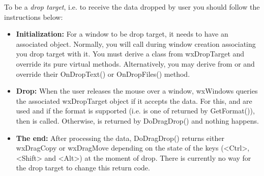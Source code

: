 To be a {\it drop target}, i.e. to receive the data dropped by user you should
follow the instructions below:

\begin{itemize}\itemsep=0pt
\item {\bf Initialization:} For a window to be drop target, it needs to have
an associated  object. Normally, you will
call  during window
creation associating you drop target with it. You must derive a class from
wxDropTarget and override its pure virtual methods. Alternatively, you may
derive from  or
 and override their OnDropText()
or OnDropFiles() method.

\item {\bf Drop:} When the user releases the mouse over a window, wxWindows
queries the associated wxDropTarget object if it accepts the data. For
this,  and  are
used and if the format is
supported (i.e. is one of returned by GetFormat()), 
then  is called. 
Otherwise,  is returned by DoDragDrop() and
nothing happens.

\item {\bf The end:} After processing the data, DoDragDrop() returns either
wxDragCopy or wxDragMove depending on the state of the keys (<Ctrl>, <Shift>
and <Alt>) at the moment of drop. There is currently no way for the drop
target to change this return code.
\end{itemize}

